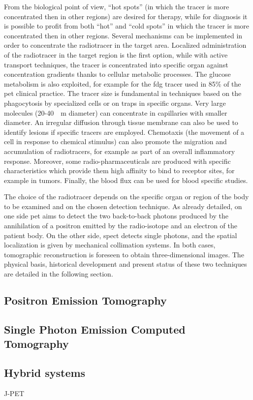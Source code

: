 From the biological point of view, \enquote{hot spots} (in which the tracer is more concentrated then in other regions) are desired for therapy, while for diagnosis it is possible to profit from both \enquote{hot} and \enquote{cold spots} {in which the tracer is more concentrated then in other regions}. Several mechanisms can be implemented in order to concentrate the radiotracer in the target area. Localized administration of the radiotracer in the target region is the first option, while with active transport techniques, the tracer is concentrated into specific organ against concentration gradients thanks to cellular metabolic processes.  The glucose metabolism is also exploited, for example for the \gls{fdg} tracer used in 85\% of the \gls{pet} clinical practice. The tracer size is fundamental in techniques based on the phagocytosis by specialized cells or on traps in specific organs. Very large molecules (20-40~\charmu ~m diameter) can concentrate in capillaries with smaller diameter. An irregular diffusion through tissue membrane can also be used to identify lesions if specific tracers are employed. Chemotaxis (the movement of a cell in response to chemical stimulus) can also promote the migration and accumulation of radiotracers, for example as part of an overall inflammatory response. Moreover, some radio-pharmaceuticals are produced with specific characteristics which provide them high affinity to bind to receptor sites, for example in tumors. Finally, the blood flux can be used for blood specific studies. 


The choice of the radiotracer depends on the specific organ or region of the body to be examined and on the chosen detection technique. As already detailed, on one side \gls{pet} aims to detect the two back-to-back photons produced by the annihilation of a positron emitted by the radio-isotope and an electron of the patient body. On the other side, \gls{spect} detects single photons, and the spatial localization is given by mechanical collimation systems. In both cases, tomographic reconstruction is foreseen to obtain three-dimensional images.
The physical basis, historical development and present status of these two techniques are detailed in the following section.  
 
\subsection{Positron Emission Tomography}\label{chap1::subsec::PET_NM}



\subsection{Single Photon Emission Computed Tomography}\label{chap1::subsec::SPECT_NM}



\subsection{Hybrid systems}\label{chap1::subsec::Hybrid_NM}

J-PET \parencite{Niedzwiecki2017}


\clearpage
